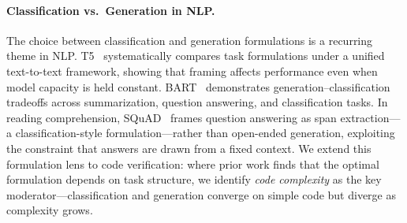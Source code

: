 \paragraph{Classification vs.\ Generation in NLP.}
The choice between classification and generation formulations is a recurring theme in NLP.
T5~\cite{raffel2020t5} systematically compares task formulations under a unified text-to-text framework, showing that framing affects performance even when model capacity is held constant.
BART~\cite{lewis2020bart} demonstrates generation--classification tradeoffs across summarization, question answering, and classification tasks.
In reading comprehension, SQuAD~\cite{rajpurkar2016squad} frames question answering as span extraction---a classification-style formulation---rather than open-ended generation, exploiting the constraint that answers are drawn from a fixed context.
We extend this formulation lens to code verification: where prior work finds that the optimal formulation depends on task structure, we identify \emph{code complexity} as the key moderator---classification and generation converge on simple code but diverge as complexity grows.